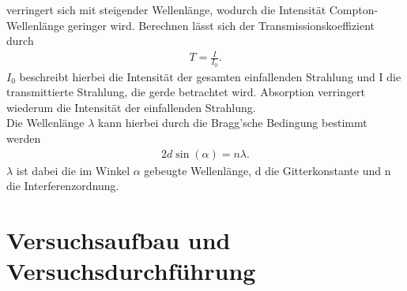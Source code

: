 verringert sich mit steigender Wellenlänge, wodurch die Intensität
Compton-Wellenlänge geringer wird. Berechnen lässt sich der Transmissionskoeffizient durch
\begin{align}
    T=\frac{I}{I_0} \label{eq:3}.
\end{align}
$I_0$ beschreibt hierbei die Intensität der gesamten einfallenden Strahlung und I
die transmittierte Strahlung, die gerde betrachtet wird.
\justifying Absorption verringert wiederum 
 die Intensität der einfallenden Strahlung.\\
Die Wellenlänge $\lambda$ kann hierbei durch die Bragg'sche Bedingung bestimmt 
werden
\begin{align}
    2d \sin (\alpha)=n \lambda \label{eq:4}.
\end{align}
$\lambda$ ist dabei die im Winkel $\alpha$ gebeugte Wellenlänge, d die Gitterkonstante und n die Interferenzordnung.



\section{Versuchsaufbau und Versuchsdurchführung}\justifying

